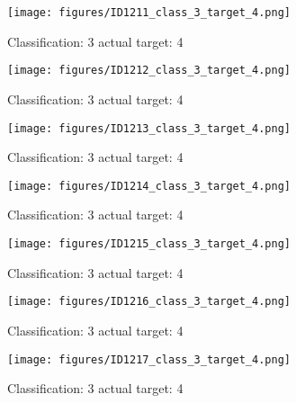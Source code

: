 \begin{figure}[h!]
\begin{center}
\texttt{[image: figures/ID1211\_class\_3\_target\_4.png]}
\end{center}
\caption{ Classification: 3 actual target: 4}
\label{fig:ID1211_class_3_target_4}
\end{figure}
\begin{figure}[h!]
\begin{center}
\texttt{[image: figures/ID1212\_class\_3\_target\_4.png]}
\end{center}
\caption{ Classification: 3 actual target: 4}
\label{fig:ID1212_class_3_target_4}
\end{figure}
\begin{figure}[h!]
\begin{center}
\texttt{[image: figures/ID1213\_class\_3\_target\_4.png]}
\end{center}
\caption{ Classification: 3 actual target: 4}
\label{fig:ID1213_class_3_target_4}
\end{figure}
\begin{figure}[h!]
\begin{center}
\texttt{[image: figures/ID1214\_class\_3\_target\_4.png]}
\end{center}
\caption{ Classification: 3 actual target: 4}
\label{fig:ID1214_class_3_target_4}
\end{figure}
\begin{figure}[h!]
\begin{center}
\texttt{[image: figures/ID1215\_class\_3\_target\_4.png]}
\end{center}
\caption{ Classification: 3 actual target: 4}
\label{fig:ID1215_class_3_target_4}
\end{figure}
\begin{figure}[h!]
\begin{center}
\texttt{[image: figures/ID1216\_class\_3\_target\_4.png]}
\end{center}
\caption{ Classification: 3 actual target: 4}
\label{fig:ID1216_class_3_target_4}
\end{figure}
\begin{figure}[h!]
\begin{center}
\texttt{[image: figures/ID1217\_class\_3\_target\_4.png]}
\end{center}
\caption{ Classification: 3 actual target: 4}
\label{fig:ID1217_class_3_target_4}
\end{figure}
